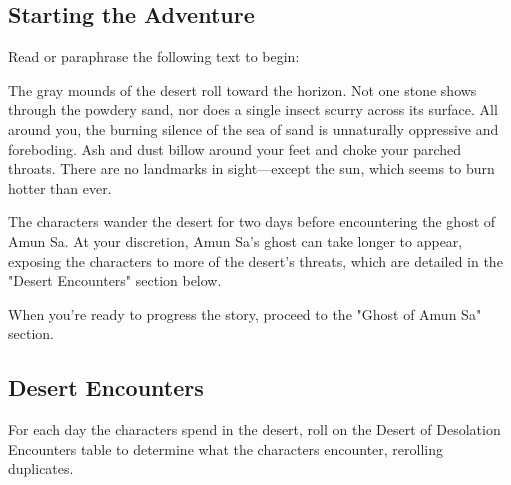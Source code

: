 \documentclass[10pt,a4paper,twoside,bg=print,twocolumn,openany,nodeprecatedcode]{dndbook}
\begin{document}
\subsection{Starting the Adventure}
Read or paraphrase the following text to begin:

\begin{DndReadAloud}{}
The gray mounds of the desert roll toward the horizon. Not one stone shows through the powdery sand, nor does a single insect scurry across its surface. All around you, the burning silence of the sea of sand is unnaturally oppressive and foreboding. Ash and dust billow around your feet and choke your parched throats. There are no landmarks in sight—except the sun, which seems to burn hotter than ever.

\end{DndReadAloud}

The characters wander the desert for two days before encountering the ghost of Amun Sa. At your discretion, Amun Sa's ghost can take longer to appear, exposing the characters to more of the desert's threats, which are detailed in the "Desert Encounters" section below.

When you're ready to progress the story, proceed to the "Ghost of Amun Sa" section.

\subsection{Desert Encounters}
For each day the characters spend in the desert, roll on the Desert of Desolation Encounters table to determine what the characters encounter, rerolling duplicates.
\end{document}
